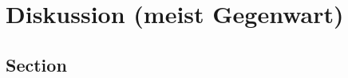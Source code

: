 %
%
\let\raggedsection\centering 
\chapter{Diskussion (meist Gegenwart)}
\let\raggedsection\raggedright 
\glsresetall
\section{Section}\label{section.diskussion}


